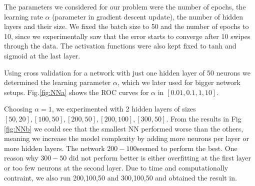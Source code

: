 The parameters we considered for our problem were the number of epochs, the learning rate $\alpha$ (parameter in gradient descent update), the number of hidden layers and their size. We fixed the batch size to 50 and the number of epochs to 10, since we experimentally saw that the error starts to converge after 10 swipes through the data. The activation functions were also kept fixed to tanh and sigmoid at the last layer. 

Using cross validation for a network with just one hidden layer of 50 neurons we determined the learning parameter $\alpha$, which we later used for bigger network setups. Fig.\ref{fig:NNa}  shows the ROC curves for $\alpha$ in  $[0.01,0.1,1,10]$.

Choosing $\alpha=1$, we experimented with 2 hidden layers of sizes $[50,20],[100,50],[200,50],[200,100],[300,50]$. From the results in Fig \ref{fig:NNb} we could see that the smallest NN performed worse than the others, meaning we increase the model complexity by adding more neurons per layer or more hidden layers. The network $200-100$seemed to perform the best. One reason why $300-50$ did not perform better is either overfitting at the first layer or too few neurons at the second layer. Due to time and computationally contraint, we also run 200,100,50 and 300,100,50 and obtained the result in.

